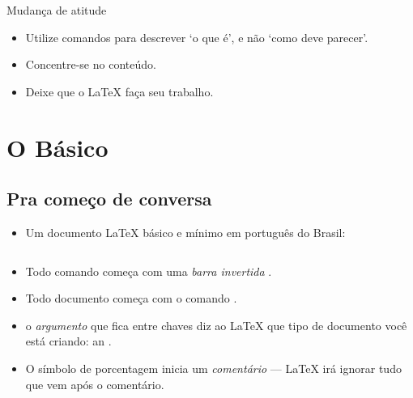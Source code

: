 \documentclass{beamer}
\begin{document}
\begin{frame}[fragile]{Mudança de atitude}

\begin{itemize}
\item Utilize comandos para descrever `o que é', e não  `como deve parecer'.
\item Concentre-se no conteúdo.
\item Deixe que o \LaTeX{} faça seu trabalho.
\end{itemize}
\end{frame}

\section{O Básico}
\subsection{Pra começo de conversa}
\begin{frame}[fragile]{\insertsubsection}
\begin{itemize}
\item Um documento  \LaTeX{} básico e mínimo em português do Brasil:
\inputminted[frame=single]{latex}{basics.tex}
\item Todo comando começa com uma \emph{barra invertida} \keystrokebftt{\bs}.
\item Todo documento começa com o comando
 .
\item o \emph{argumento} que fica entre chaves \keystrokebftt{\{}
\keystrokebftt{\}} diz ao \LaTeX{} que tipo de documento você está criando:
an .
\item O símbolo de porcentagem \keystrokebftt{\%} inicia um  \emph{comentário}
--- \LaTeX{} irá ignorar tudo que vem após o comentário.
\end{itemize}
\end{frame}
\end{document}
